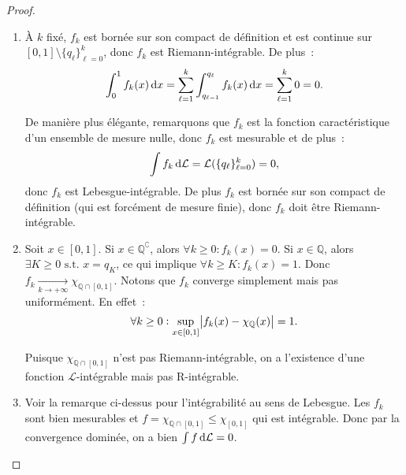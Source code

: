 \documentclass{article}
\theoremstyle{definition}
\newcommand{\pinfty}{{+\infty}}
\newcommand{\st}{\text{ s.t. }}
\newcommand{\C}{\complement}
\newcommand{\Q}{{\mathbb Q}}
\begin{document}
\begin{proof}~
\begin{enumerate}
	\item À $k$ fixé, $f_k$ est bornée sur son compact de définition et est continue sur $[0, 1] \setminus \{q_\ell\}_{\ell=0}^k$, donc $f_k$ est Riemann-intégrable. De plus~:
	\[\int_0^1f_k(x)\dif x = \sum_{\ell=1}^k\int_{q_{\ell-1}}^{q_\ell}f_k(x)\dif x = \sum_{\ell=1}^k0 = 0.\]

	De manière plus élégante, remarquons que $f_k$ est la fonction caractéristique d'un ensemble de mesure nulle, donc $f_k$ est mesurable et de plus~:
	\[\int f_k\dif\mathcal L = \mathcal L(\{q_\ell\}_{\ell=0}^k) = 0,\]
	donc $f_k$ est Lebesgue-intégrable. De plus $f_k$ est bornée sur son compact de définition (qui est forcément de mesure finie), donc $f_k$ doit être Riemann-intégrable.

	\item Soit $x \in [0, 1]$. Si $x \in \Q^\C$, alors $\forall k \geq 0 : f_k(x) = 0$. Si $x \in \Q$, alors $\exists K \geq 0 \st x = q_K$, ce qui implique
	$\forall k \geq K : f_k(x) = 1$. Donc $f_k \xrightarrow[k \to \pinfty]{} \chi_{\Q \cap [0, 1]}$. Notons que $f_k$ converge simplement mais pas uniformément. En effet~:
	\[\forall k \geq 0 : \sup_{x \in [0, 1]}\abs {f_k(x)-\chi_\Q(x)} = 1.\]

	Puisque $\chi_{\Q \cap [0, 1]}$ n'est pas Riemann-intégrable, on a l'existence d'une fonction $\mathcal L$-intégrable mais pas R-intégrable.

	\item Voir la remarque ci-dessus pour l'intégrabilité au sens de Lebesgue. Les $f_k$ sont bien mesurables et $f = \chi_{\Q \cap [0, 1]} \leq \chi_{[0, 1]}$ qui est intégrable.
	Donc par la convergence dominée, on a bien $\int f\dif\mathcal L = 0$.
\end{enumerate}
\end{proof}

\newpage
\end{document}

